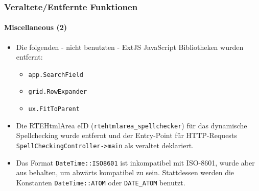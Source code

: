 \begin{frame}[fragile]
	\frametitle{Veraltete/Entfernte Funktionen}
	\framesubtitle{Miscellaneous (2)}

	\begin{itemize}

		\item Die folgenden - nicht benutzten - ExtJS JavaScript Bibliotheken wurden entfernt:

			\begin{itemize}
				\item \texttt{app.SearchField}
				\item \texttt{grid.RowExpander}
				\item \texttt{ux.FitToParent}
			\end{itemize}

		\item Die RTEHtmlArea eID (\texttt{rtehtmlarea\_spellchecker}) für das dynamische Spellchecking wurde entfernt und der Entry-Point für HTTP-Requests
			\texttt{SpellCheckingController->main} als veraltet deklariert.

		\item Das Format \texttt{DateTime::ISO8601} ist inkompatibel mit ISO-8601,
			wurde aber aus behalten, um abwärts kompatibel zu sein.
			Stattdessen werden die Konstanten \texttt{DateTime::ATOM} oder \texttt{DATE\_ATOM} benutzt.

	\end{itemize}

\end{frame}


